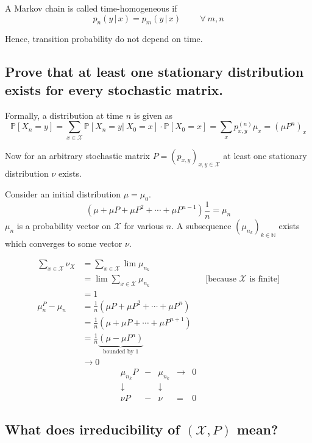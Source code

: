 \documentclass[a4paper]{article}
\newcommand\os[2][P]{\mathbb{#1}\left[#2\right]}
\newcommand\cons[3][P]{\mathbb{#1}\left[#2 \left|\:#3\right]\right.}
\newcommand\fall{\:\forall\:}
\newcommand\converges{\rightarrow}
\theoremstyle{definition}
\begin{document}
A Markov chain is called time-homogeneous if
\[ p_n(y\,|\,x) = p_m(y\,|\,x) \qquad \fall m,n \]

Hence, transition probability do not depend on time.

\subsection{Prove that at least one stationary distribution exists for every stochastic matrix.}

Formally, a distribution at time $n$ is given as
\[
  \os{X_n=y}
    = \sum_{x\in\mathcal{X}} \cons{X_n=y}{X_0=x} \cdot \os{X_0=x}
    = \sum_x p_{x,y}^{(n)} \mu_x
    = \left(\mu P^n\right)_x
\]

Now for an arbitrary stochastic matrix $P = \left(p_{x,y}\right)_{x,y \in \mathcal{X}}$ at least one stationary distribution $\nu$ exists.

Consider an initial distribution $\mu = \mu_0$.
\[ \left( \mu + \mu P + \mu P^2 + \dotsb + \mu P^{n-1} \right) \frac1n = \mu_n \]
$\mu_n$ is a probability vector on $\mathcal{X}$ for various $n$. A subsequence $\left(\mu_{n_k}\right)_{k \in \mathbb{N}}$ exists which converges to some vector $\nu$.

\begin{align*}
  \sum_{x \in \mathcal{X}} \nu_X &= \sum_{x \in \mathcal{X}} \lim \mu_{n_k} \\
                                 &= \lim \sum_{x \in \mathcal{X}} \mu_{n_k} && \text{[because $\mathcal{X}$ is finite]} \\
                                 &= 1 \\
  \mu_n^P - \mu_n &= \frac1n \left(\mu P + \mu P^2 + \dotsb + \mu P^n\right) \\
                  &= \frac1n \left(\mu + \mu P + \dotsb + \mu P^{n+1}\right) \\
                  &= \frac1n \underbrace{\left(\mu - \mu P^n\right)}_{\text{bounded by } 1} \\
                  &\converges 0
\end{align*}
\[
 \begin{array}{ccccc}
   \mu_{n_k} P & - & \mu_{n_k}  & \rightarrow & 0 \\
   \downarrow  &   & \downarrow &             & \\
   \nu P       & - & \nu        & =           & 0
 \end{array}
\]

\subsection{What does irreducibility of $(\mathcal{X}, P)$ mean?}
\end{document}
